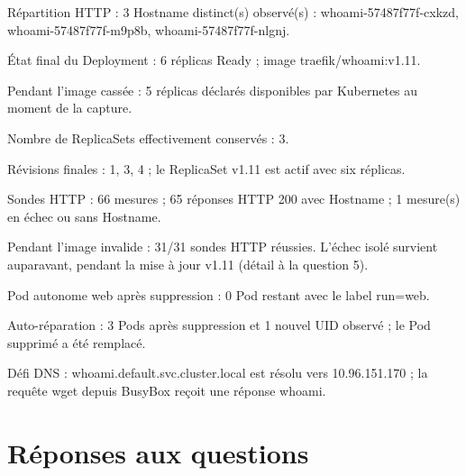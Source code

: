\documentclass[11pt,a4paper]{article}
\begin{document}
Répartition HTTP : 3 Hostname distinct(s) observé(s) : whoami-57487f77f-cxkzd, whoami-57487f77f-m9p8b, whoami-57487f77f-nlgnj.

État final du Deployment : 6 réplicas Ready ; image traefik/whoami:v1.11.

Pendant l'image cassée : 5 réplicas déclarés disponibles par Kubernetes au moment de la capture.

Nombre de ReplicaSets effectivement conservés : 3.

Révisions finales : 1, 3, 4 ; le ReplicaSet v1.11 est actif avec six réplicas.

Sondes HTTP : 66 mesures ; 65 réponses HTTP 200 avec Hostname ; 1 mesure(s) en échec ou sans Hostname.

Pendant l'image invalide : 31/31 sondes HTTP réussies. L'échec isolé survient auparavant, pendant la mise à jour v1.11 (détail à la question 5).

Pod autonome web après suppression : 0 Pod restant avec le label run=web.

Auto-réparation : 3 Pods après suppression et 1 nouvel UID observé ; le Pod supprimé a été remplacé.

Défi DNS : whoami.default.svc.cluster.local est résolu vers 10.96.151.170 ; la requête wget depuis BusyBox reçoit une réponse whoami.

\clearpage
{}\section{Réponses aux questions}
\end{document}
